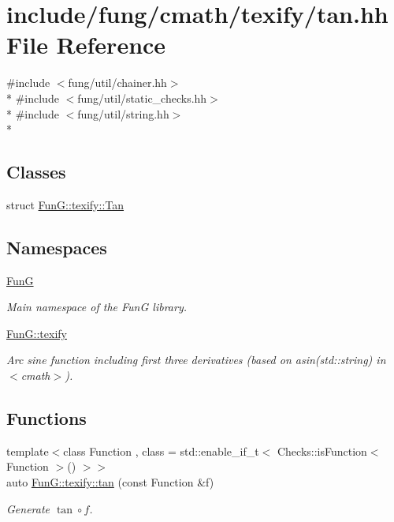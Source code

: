 \hypertarget{texify_2tan_8hh}{\section{include/fung/cmath/texify/tan.hh File Reference}
\label{texify_2tan_8hh}
}
{\ttfamily \#include $<$fung/util/chainer.\-hh$>$}\\*
{\ttfamily \#include $<$fung/util/static\-\_\-checks.\-hh$>$}\\*
{\ttfamily \#include $<$fung/util/string.\-hh$>$}\\*
\subsection*{Classes}
\begin{DoxyCompactItemize}
\item 
struct \hyperlink{structFunG_1_1texify_1_1Tan}{Fun\-G\-::texify\-::\-Tan}
\end{DoxyCompactItemize}
\subsection*{Namespaces}
\begin{DoxyCompactItemize}
\item 
\hyperlink{namespaceFunG}{Fun\-G}
\begin{DoxyCompactList}\small\item\em Main namespace of the Fun\-G library. \end{DoxyCompactList}\item 
\hyperlink{namespaceFunG_1_1texify}{Fun\-G\-::texify}
\begin{DoxyCompactList}\small\item\em Arc sine function including first three derivatives (based on asin(std\-::string) in $<$cmath$>$). \end{DoxyCompactList}\end{DoxyCompactItemize}
\subsection*{Functions}
\begin{DoxyCompactItemize}
\item 
{\footnotesize template$<$class Function , class  = std\-::enable\-\_\-if\-\_\-t$<$ Checks\-::is\-Function$<$ Function $>$() $>$$>$ }\\auto \hyperlink{namespaceFunG_1_1texify_a04dd3b4da69850caa4be87e662fd3f5f}{Fun\-G\-::texify\-::tan} (const Function \&f)
\begin{DoxyCompactList}\small\item\em Generate $ \tan\circ f $. \end{DoxyCompactList}\end{DoxyCompactItemize}

